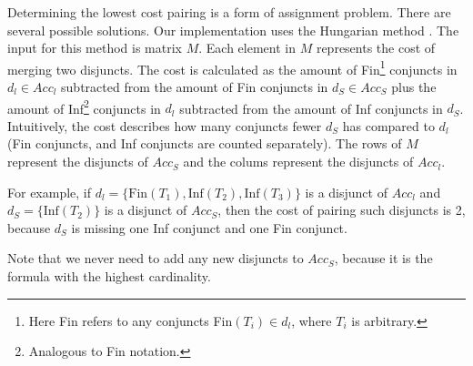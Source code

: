 \documentclass[
  digital, %
  twoside, %
  table,   %
  lof,     %
  lot,     %
]{fithesis3}
\begin{document}
Determining the lowest cost pairing is a form of assignment problem. There are several possible solutions. Our implementation uses the Hungarian method \cite{hungarian_method}. The input for this method is matrix $M$. Each element in $M$ represents the cost of merging two disjuncts. The cost is calculated as the amount of Fin\footnote{Here Fin refers to any conjuncts Fin$(T_i) \in d_l$, where $T_i$ is arbitrary.} conjuncts in $d_l \in Acc_l$ subtracted from the amount of Fin conjuncts in $d_S \in Acc_S$ plus the amount of Inf\footnote{Analogous to Fin notation.} conjuncts in $d_l$ subtracted from the amount of Inf conjuncts in $d_S$. Intuitively, the cost describes how many conjuncts fewer $d_S$ has compared to $d_l$ (Fin conjuncts, and Inf conjuncts are counted separately). The rows of $M$ represent the disjuncts of $Acc_S$ and the colums represent the disjuncts of $Acc_l$.

For example, if $d_l = \{\text{Fin}(T_1), \text{Inf}(T_2), \text{Inf}(T_3)\}$ is a disjunct of $Acc_l$ and $d_S = \{\text{Inf}(T_2)\}$ is a disjunct of $Acc_S$, then the cost of pairing such disjuncts is 2, because $d_S$ is missing one Inf conjunct and one Fin conjunct.

Note that we never need to add any new disjuncts to  $Acc_S$, because it is the formula with the highest cardinality.
\end{document}

